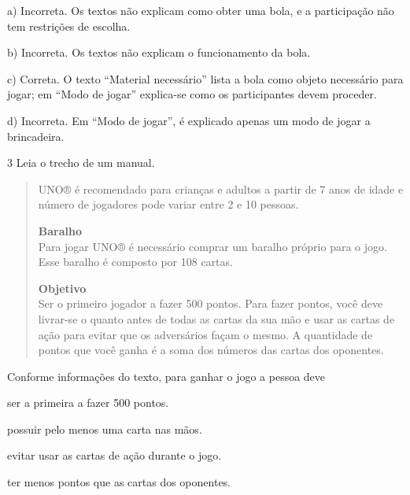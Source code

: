 \begin{escolha}
\begin{escolha}
a) Incorreta. Os textos não explicam como obter uma bola, e a 
participação não tem restrições de escolha.  

b) Incorreta. Os textos não explicam o funcionamento da bola.

c) Correta. O texto ``Material necessário'' lista a bola como objeto 
necessário para jogar; em ``Modo de jogar'' explica-se como os 
participantes devem proceder.

d) Incorreta. Em ``Modo de jogar'', é explicado apenas um modo de jogar
a brincadeira.

\num{3} Leia o trecho de um manual.

\begin{quote}
UNO® é recomendado para crianças e adultos a partir de 7 anos de idade e número de jogadores pode variar entre 2 e 10 pessoas.

\textbf{Baralho}\\
Para jogar UNO® é necessário comprar um baralho próprio para o jogo. Esse baralho é composto por 108 cartas.

\textbf{Objetivo}\\
Ser o primeiro jogador a fazer 500 pontos. Para fazer pontos, você deve
livrar-se o quanto antes de todas as cartas da sua mão e usar as cartas 
de ação para evitar que os adversários façam o mesmo. A quantidade de 
pontos que você ganha é a soma dos números das cartas dos oponentes.
\end{quote}


Conforme informações do texto, para ganhar o jogo a pessoa deve

\begin{escolha}
\item ser a primeira a fazer 500 pontos.

\item possuir pelo menos uma carta nas mãos.

\item evitar usar as cartas de ação durante o jogo.

\item ter menos pontos que as cartas dos oponentes.
\end{escolha}


\end{escolha}
\end{escolha}
